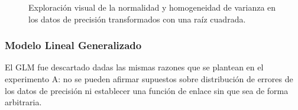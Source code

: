 \begin{figure}[H]
\centering
\caption{Exploración visual de la normalidad y homogeneidad de varianza en los datos de precisión transformados con una raíz cuadrada.}
\label{fig:transformacion-sqrt-p}
\end{figure}


\subsubsection{Modelo Lineal Generalizado}

El GLM fue descartado dadas las mismas razones que se plantean en el experimento A: no se pueden afirmar supuestos sobre distribución de errores de los datos de precisión ni establecer una función de enlace sin que sea de forma arbitraria.


